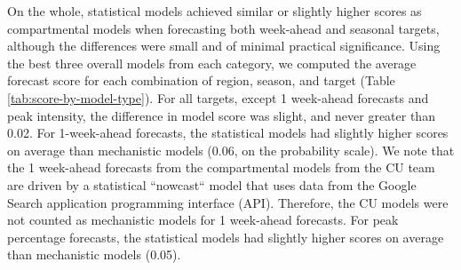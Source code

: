 \documentclass{article}\usepackage[]{graphicx}\usepackage[]{color}
\begin{document}
On the whole, statistical models achieved similar or slightly higher scores as compartmental models when forecasting both week-ahead and seasonal targets, although the differences were small and of minimal practical significance. 
Using the best three overall models from each category, we computed the average forecast score for each combination of region, season, and target (Table \ref{tab:score-by-model-type}). 
For all targets, except 1 week-ahead forecasts and peak intensity, the difference in model score was slight, and never greater than 
0.02.
For 1-week-ahead forecasts, the statistical models had slightly higher scores on average than mechanistic models  
(0.06, on the probability scale). 
We note that the 1 week-ahead forecasts from the compartmental models from the CU team are driven by a statistical ``nowcast`` model that uses data from the Google Search application programming interface (API).\cite{Kandula2017}
Therefore, the CU models were not counted as mechanistic models for 1 week-ahead forecasts.
For peak percentage forecasts, the statistical models had slightly higher scores on average than mechanistic models  
(0.05). 




% 


\end{document}

